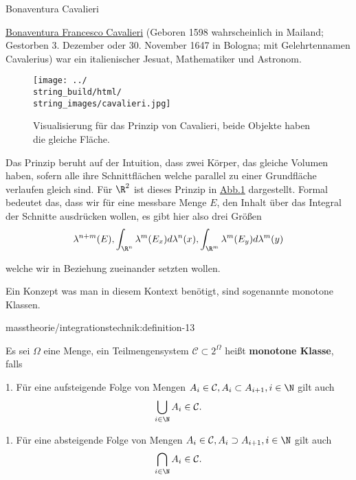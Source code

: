 \documentclass[letterpaper,10pt,german]{jupyterBook}
\begin{document}
\begin{emphBox}{Bonaventura Cavalieri}{}

\par
\href{https://de.wikipedia.org/wiki/Bonaventura\_Cavalieri}{Bonaventura Francesco Cavalieri} (Geboren 1598 wahrscheinlich in Mailand; Gestorben 3. Dezember oder 30. November 1647 in Bologna; mit Gelehrtennamen Cavalerius) war ein italienischer Jesuat, Mathematiker und Astronom.
\end{emphBox}

\begin{figure}[htbp]
\centering


\noindent\texttt{[image: ../\\string\_build/html/\\string\_images/cavalieri.jpg]}
\caption{Visualisierung für das Prinzip von Cavalieri, beide Objekte haben die gleiche Fläche.}\label{\detokenize{masstheorie/integrationstechnik:fig-cavalieri}}\end{figure}

\par
Das Prinzip beruht auf der Intuition, dass zwei Körper, das gleiche Volumen haben, sofern alle ihre Schnittflächen welche parallel zu einer Grundfläche verlaufen gleich sind. Für \(\R^2\) ist dieses Prinzip in \hyperref[\detokenize{masstheorie/integrationstechnik:fig-cavalieri}]{Abb.\@ \ref{\detokenize{masstheorie/integrationstechnik:fig-cavalieri}}} dargestellt. Formal bedeutet das, dass wir für eine messbare Menge \(E\), den Inhalt über das Integral der Schnitte ausdrücken wollen, es gibt hier also drei Größen
\begin{align*}
\lambda^{n+m}(E), \int_{\R^n} \lambda^m(E_x) d\lambda^n(x), \int_{\R^m} \lambda^m(E_y) d\lambda^m(y)
\end{align*}
\par
welche wir in Beziehung zueinander setzten wollen.

\par
Ein Konzept was man in diesem Kontext benötigt, sind sogenannte monotone Klassen.
\begin{definition}{}{masstheorie/integrationstechnik:definition-13}



\par
Es sei \(\Omega\) eine Menge, ein Teilmengensystem \(\mathcal{C}\subset 2^\Omega\) heißt \textbf{monotone Klasse}, falls

\par
1. Für eine aufsteigende Folge von Mengen \(A_i\in\mathcal{C}, A_i\subset A_{i+1}, i\in\N\) gilt auch
\begin{align*}
\bigcup_{i\in\N} A_i\in\mathcal{C}.
\end{align*}
\par
1. Für eine absteigende Folge von Mengen \(A_i\in\mathcal{C}, A_i\supset A_{i+1}, i\in\N\) gilt auch
\begin{align*}
\bigcap_{i\in\N} A_i\in\mathcal{C}.
\end{align*}\end{definition}
\end{document}
